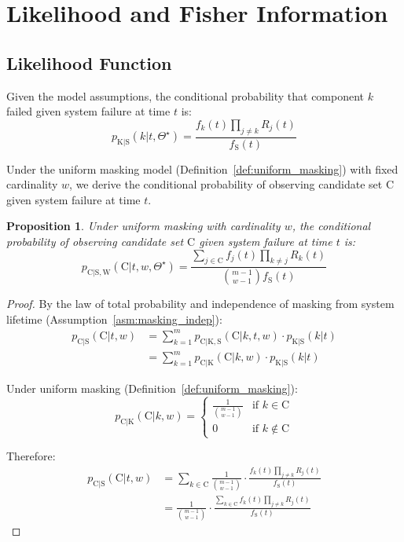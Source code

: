 \documentclass[pdflatex,sn-mathphys-num,Numbered]{sn-jnl}
\newcommand{\RV}[1]{\mathrm{#1}}
\newcommand{\sv}{\RV{S}}           %
\newcommand{\cand}{\RV{C}}         %
\newcommand{\rvcand}{\RV{C}}       %
\newcommand{\sysparam}{\Theta}
\newcommand{\tparam}[1]{{#1}^{\star}}  %
\newcommand{\pdf}{f}
\newcommand{\pmf}{p}
\newcommand{\srv}{R}
\newcommand{\spdf}{\pdf_{\sv}}
\theoremstyle{thmstyleone}
\newtheorem{proposition}[theorem]{Proposition}
\theoremstyle{thmstylethree}
\theoremstyle{thmstyletwo}
\begin{document}
\section{Likelihood and Fisher Information}
\label{sec:general_fim}

\subsection{Likelihood Function}

Given the model assumptions, the conditional probability that component $k$ failed given system failure at time $t$ is:
\begin{equation}
\label{eq:component_failure_prob}
\pmf_{\RV{K} | \sv}(k | t, \tparam{\sysparam}) = \frac{\pdf_k(t) \prod_{j \neq k} \srv_j(t)}{\spdf(t)}
\end{equation}

Under the uniform masking model (Definition~\ref{def:uniform_masking}) with fixed cardinality $w$, we derive the conditional probability of observing candidate set $\cand$ given system failure at time $t$.

\begin{proposition}
\label{prop:candidate_prob}
Under uniform masking with cardinality $w$, the conditional probability of observing candidate set $\cand$ given system failure at time $t$ is:
\begin{equation}
\label{eq:candidate_prob}
\pmf_{\rvcand | \sv, \RV{W}}(\cand | t, w, \tparam{\sysparam}) = \frac{\sum_{j \in \cand} \pdf_j(t) \prod_{k \neq j} \srv_k(t)}{\binom{m-1}{w-1} \spdf(t)}
\end{equation}
\end{proposition}

\begin{proof}
By the law of total probability and independence of masking from system lifetime (Assumption~\ref{asm:masking_indep}):
\begin{align}
\pmf_{\rvcand | \sv}(\cand | t, w) &= \sum_{k=1}^{m} \pmf_{\rvcand | \RV{K}, \sv}(\cand | k, t, w) \cdot \pmf_{\RV{K} | \sv}(k | t) \nonumber\\
&= \sum_{k=1}^{m} \pmf_{\rvcand | \RV{K}}(\cand | k, w) \cdot \pmf_{\RV{K} | \sv}(k | t)
\end{align}

Under uniform masking (Definition~\ref{def:uniform_masking}):
\begin{equation}
\pmf_{\rvcand | \RV{K}}(\cand | k, w) = \begin{cases}
\frac{1}{\binom{m-1}{w-1}} & \text{if } k \in \cand \\
0 & \text{if } k \notin \cand
\end{cases}
\end{equation}

Therefore:
\begin{align}
\pmf_{\rvcand | \sv}(\cand | t, w) &= \sum_{k \in \cand} \frac{1}{\binom{m-1}{w-1}} \cdot \frac{\pdf_k(t) \prod_{j \neq k} \srv_j(t)}{\spdf(t)} \nonumber\\
&= \frac{1}{\binom{m-1}{w-1}} \cdot \frac{\sum_{k \in \cand} \pdf_k(t) \prod_{j \neq k} \srv_j(t)}{\spdf(t)}
\end{align}
\end{proof}
\end{document}
